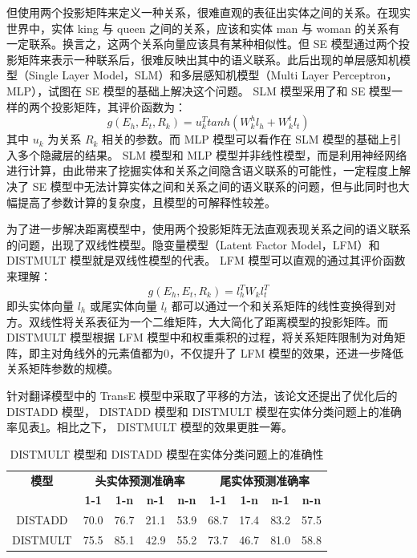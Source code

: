 \documentclass{llncs}
\begin{document}
但使用两个投影矩阵来定义一种关系，很难直观的表征出实体之间的关系。在现实世界中，实体 king 与 queen 之间的关系，应该和实体 man 与 woman 的关系有一定联系。换言之，这两个关系向量应该具有某种相似性。但 SE 模型通过两个投影矩阵来表示一种联系后，很难反映出其中的语义联系。此后出现的单层感知机模型（Single Layer Model，SLM）\cite{DBLP:conf/nips/SocherCMN13}和多层感知机模型（Multi Layer Perceptron，MLP）\cite{DBLP:conf/kdd/0001GHHLMSSZ14}，试图在 SE 模型的基础上解决这个问题。 SLM 模型采用了和 SE 模型一样的两个投影矩阵，其评价函数为：
\begin{displaymath}
g(E_h,E_t,R_k)=u_k^Ttanh(W^h_kl_h+W^t_kl_t)
\end{displaymath}
其中 $u_k$ 为关系 $R_k$ 相关的参数。而 MLP 模型可以看作在 SLM 模型的基础上引入多个隐藏层的结果。 SLM 模型和 MLP 模型并非线性模型，而是利用神经网络进行计算，由此带来了挖掘实体和关系之间隐含语义联系的可能性，一定程度上解决了 SE 模型中无法计算实体之间和关系之间的语义联系的问题，但与此同时也大幅提高了参数计算的复杂度，且模型的可解释性较差。

为了进一步解决距离模型中，使用两个投影矩阵无法直观表现关系之间的语义联系的问题，出现了双线性模型。隐变量模型（Latent Factor Model，LFM）\cite{DBLP:conf/nips/JenattonRBO12}和 DISTMULT 模型\cite{DBLP:journals/corr/YangYHGD14a}就是双线性模型的代表。 LFM 模型可以直观的通过其评价函数来理解：
\begin{displaymath}
g(E_h,E_t,R_k)=l_h^TW_kl_t^T
\end{displaymath}
即头实体向量 $l_h$ 或尾实体向量 $l_t$ 都可以通过一个和关系矩阵的线性变换得到对方。双线性将关系表征为一个二维矩阵，大大简化了距离模型的投影矩阵。而 DISTMULT 模型根据 LFM 模型中和权重乘积的过程，将关系矩阵限制为对角矩阵，即主对角线外的元素值都为0，不仅提升了 LFM 模型的效果，还进一步降低关系矩阵参数的规模。

针对翻译模型中的 TransE 模型\cite{DBLP:conf/nips/BordesUGWY13}中采取了平移的方法，该论文还提出了优化后的 DISTADD 模型\cite{DBLP:journals/corr/YangYHGD14a}， DISTADD 模型和 DISTMULT 模型在实体分类问题上的准确率见表\ref{tb:DISTMULT&DISTADD}。相比之下， DISTMULT 模型的效果更胜一筹。

\begin{table}
	\centering
	\caption{ DISTMULT 模型和 DISTADD 模型在实体分类问题上的准确性}
	\label{tb:DISTMULT&DISTADD}
	\begin{threeparttable}
		\begin{tabular}{ccccccccc}
			\hline
			\textbf{模型} & \multicolumn{4}{c}{\textbf{头实体预测准确率}} & \multicolumn{4}{c}{\textbf{尾实体预测准确率}} \\
			\textbf{} & \textbf{1-1} & \textbf{1-n} & \textbf{n-1} & \textbf{n-n} & \textbf{1-1} & \textbf{1-n} & \textbf{n-1} & \textbf{n-n} \\ \hline
			DISTADD & 70.0 & 76.7 & 21.1 & 53.9 & 68.7 & 17.4 & 83.2 & 57.5 \\
			DISTMULT & 75.5 & 85.1 & 42.9 & 55.2 & 73.7 & 46.7 & 81.0 & 58.8 \\ \hline
		\end{tabular}
	\end{threeparttable}
\end{table}
\end{document}
